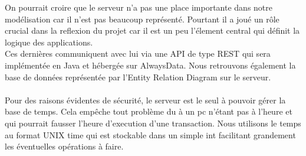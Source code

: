 \documentclass[../rapport.tex]{subfiles}
\begin{document}
On pourrait croire que le serveur n'a pas une place importante dans notre modélisation car il n'est pas beaucoup représenté.
Pourtant il a joué un rôle crucial dans la reflexion du projet car il est un peu l'élement central qui définit la logique des applications. \\
Ces dernières communiquent avec lui via une API de type REST qui sera implémentée en Java et hébergée sur AlwaysData. 
Nous retrouvons également la base de données représentée par l'Entity Relation Diagram sur le serveur. \\
\\
Pour des raisons évidentes de sécurité, le serveur est le seul à pouvoir gérer la base de temps. Cela empêche tout problème du à un pc n'étant pas à l'heure et qui pourrait fausser l'heure d'execution d'une transaction.
Nous utilisons le temps au format UNIX time qui est stockable dans un simple int facilitant grandement les éventuelles opérations à faire.

\newpage
\end{document}
